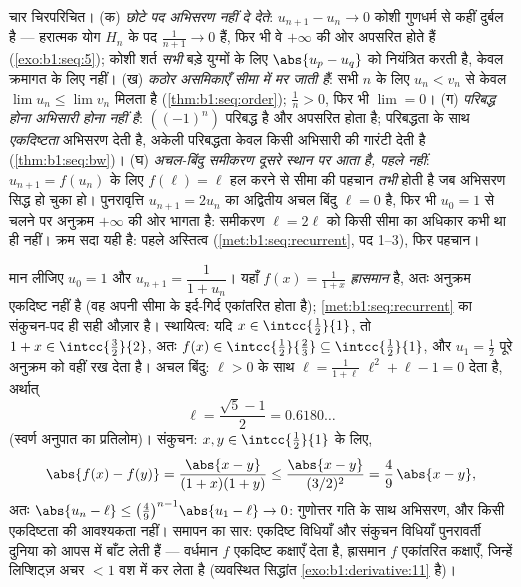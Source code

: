 \begin{remark}[सीमाओं की सामान्य भूलें]
चार चिरपरिचित। (क) \emph{छोटे पद अभिसरण नहीं दे देते}: $u_{n+1} - u_n \to 0$
कोशी गुणधर्म से कहीं दुर्बल है --- हरात्मक योग $H_n$ के पद $\frac{1}{n+1}
\to 0$ हैं, फिर भी वे $+\infty$ की ओर अपसरित होते हैं (\cref{exo:b1:seq:5});
कोशी शर्त \emph{सभी} बड़े युग्मों के लिए $\abs{u_p - u_q}$ को नियंत्रित करती
है, केवल क्रमागत के लिए नहीं। (ख) \emph{कठोर असमिकाएँ सीमा में मर जाती हैं}:
सभी $n$ के लिए $u_n < v_n$ से केवल $\lim u_n \leq \lim v_n$ मिलता है
(\cref{thm:b1:seq:order}); $\frac1n > 0$, फिर भी $\lim = 0$। (ग)
\emph{परिबद्ध होना अभिसारी होना नहीं है}: $((-1)^n)$ परिबद्ध है और अपसरित
होता है; परिबद्धता के साथ \emph{एकदिष्टता} अभिसरण देती है, अकेली परिबद्धता
केवल किसी अभिसारी  की गारंटी देती है (\cref{thm:b1:seq:bw})। (घ)
\emph{अचल-बिंदु समीकरण दूसरे स्थान पर आता है, पहले नहीं}: $u_{n+1} = f(u_n)$
के लिए $f(\ell) = \ell$ हल करने से सीमा की पहचान \emph{तभी} होती है जब
अभिसरण सिद्ध हो चुका हो। पुनरावृत्ति $u_{n+1} = 2u_n$ का अद्वितीय अचल बिंदु
$\ell = 0$ है, फिर भी $u_0 = 1$ से चलने पर अनुक्रम $+\infty$ की ओर भागता है:
समीकरण $\ell = 2\ell$ को किसी सीमा का अधिकार कभी था ही नहीं। क्रम सदा यही
है: पहले अस्तित्व (\cref{met:b1:seq:recurrent}, पद 1--3), फिर पहचान।
\end{remark}

\begin{example}[ह्रासमान $f$: स्वर्ण पुनरावृत्ति]\label{ex:b1:seq:golden}
मान लीजिए $u_0 = 1$ और $u_{n+1} = \dfrac{1}{1 + u_n}$। यहाँ $f(x) =
\frac{1}{1+x}$ \emph{ह्रासमान} है, अतः अनुक्रम एकदिष्ट नहीं है (वह अपनी सीमा
के इर्द-गिर्द एकांतरित होता है); \cref{met:b1:seq:recurrent} का संकुचन-पद ही
सही औज़ार है। स्थायित्व: यदि $x \in \intcc{\frac12}{1}$, तो $1 + x \in
\intcc{\frac32}{2}$, अतः $f(x) \in \intcc{\frac12}{\frac23} \subseteq
\intcc{\frac12}{1}$, और $u_1 = \frac12$ पूरे अनुक्रम को वहीं रख देता है। अचल
बिंदु: $\ell > 0$ के साथ $\ell = \frac{1}{1+\ell}$ $\ell^2 + \ell - 1 = 0$
देता है, अर्थात्
\[
\ell = \frac{\sqrt5 - 1}{2} = 0.6180\dots
\]
(स्वर्ण अनुपात का प्रतिलोम)। संकुचन: $x, y \in \intcc{\frac12}{1}$ के लिए,
\[
\abs{f(x) - f(y)} = \frac{\abs{x - y}}{(1+x)(1+y)}
\leq \frac{\abs{x-y}}{(3/2)^2} = \frac49\,\abs{x - y} ,
\]
अतः $\abs{u_n - \ell} \leq \bigl(\frac49\bigr)^{n-1}\abs{u_1 - \ell} \to 0$:
गुणोत्तर गति के साथ अभिसरण, और किसी एकदिष्टता की आवश्यकता नहीं। समापन का
सार: एकदिष्ट विधियाँ और संकुचन विधियाँ पुनरावर्ती दुनिया को आपस में बाँट
लेती हैं --- वर्धमान $f$ एकदिष्ट कक्षाएँ देता है, ह्रासमान $f$ एकांतरित
कक्षाएँ, जिन्हें लिप्शिट्ज़ अचर $< 1$ वश में कर लेता है (व्यवस्थित सिद्धांत
\cref{exo:b1:derivative:11} है)।
\end{example}

